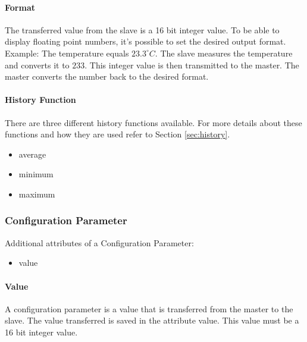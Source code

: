 
\paragraph{Format} %
\label{par:format}
The transferred value from the slave is a 16 bit integer value. To be able to display floating point numbers, it's possible to set the desired output format. Example: The temperature equals $23.3 ^\circ C$. The slave measures the temperature and converts it to $233$. This integer value is then transmitted to the master. The master converts the number back to the desired format. 

\paragraph{History Function} %
\label{par:histfunc}
There are three different history functions available. For more details about these functions and how they are used refer to Section \ref{sec:history}.
\label{par:history_function}
\begin{itemize}
    \item average
    \item minimum
    \item maximum
\end{itemize}

\subsubsection{Configuration Parameter} %
\label{ssub:configuration_parameter}
Additional attributes of a Configuration Parameter:
\begin{itemize}
    \item value
\end{itemize}

\paragraph{Value} %
\label{par:value}
A configuration parameter is a value that is transferred from the master to the slave. The value transferred is saved in the attribute value. This value must be a 16 bit integer value.


